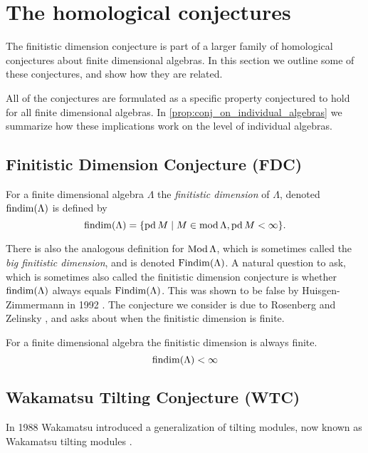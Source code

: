\section{The homological conjectures}\label{sec:homological_conjectures}

The finitistic dimension conjecture is part of a larger family of homological conjectures about finite dimensional algebras. In this section we outline some of these conjectures, and show how they are related.

All of the conjectures are formulated as a specific property conjectured to hold for all finite dimensional algebras. In \cref{prop:conj_on_individual_algebras} we summarize how these implications work on the level of individual algebras.

\subsection*{Finitistic Dimension Conjecture (FDC)}
\begin{defn}
	For a finite dimensional algebra $\Lambda$ the \emph{finitistic dimension} of $\Lambda$, denoted $\operatorname{findim}(\Lambda)$ is defined by
	$$\operatorname{findim}(\Lambda) = \{\operatorname{pd} M \mid M \in \operatorname{mod}\Lambda, \operatorname{pd} M < \infty\}.$$
\end{defn}

There is also the analogous definition for $\operatorname{Mod}\Lambda$, which is sometimes called the \emph{big finitistic dimension}, and is denoted $\operatorname{Findim}(\Lambda)$. A natural question to ask, which is sometimes also called the finitistic dimension conjecture is whether $\operatorname{findim}(\Lambda)$ always equals $\operatorname{Findim}(\Lambda)$. This was shown to be false by Huisgen-Zimmermann in 1992 \cite{ZH92}. The conjecture we consider is due to Rosenberg and Zelinsky \cite{Bass60}, and asks about when the finitistic dimension is finite.

\begin{conj}
	For a finite dimensional algebra the finitistic dimension is always finite.
	$$\operatorname{findim}(\Lambda) < \infty$$
\end{conj}

\subsection*{Wakamatsu Tilting Conjecture (WTC)}
In 1988 Wakamatsu introduced a generalization of tilting modules, now known as Wakamatsu tilting modules \cite{Wak88}.

